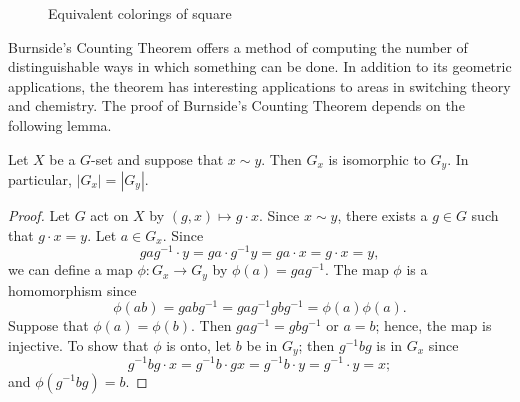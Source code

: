 \begin{figure}[htb]

\begin{center}
\end{center}
\caption{Equivalent colorings of square}
\label{colorings}
\end{figure}
 
 
Burnside's Counting Theorem offers a method of computing the number of
distinguishable ways in which something can be done. In addition to
its geometric applications, the theorem has interesting applications
to areas in switching theory and chemistry. The proof of Burnside's
Counting Theorem depends on the following lemma.
 
 
\begin{lemma}\label{Gset_lemma}
Let $X$ be a $G$-set and suppose that $x \sim y$. Then $G_x$ is
isomorphic to $G_y$.  In particular, $|G_x| = |G_y|$. 
\end{lemma}
 
 
\begin{proof}
Let $G$ act on $X$ by $(g,x) \mapsto g \cdot x$. Since $x \sim y$,
there exists a $g \in G$ such that $g \cdot x=y$. Let $a \in G_x$.
Since 
\[
gag^{-1} \cdot y = ga \cdot g^{-1}y = ga \cdot x = g \cdot
x = y,
\]
we can define a map $\phi: G_x \rightarrow G_y$ by $\phi(a) =
gag^{-1}$. The map $\phi$ is a homomorphism since 
\[
\phi(ab) = gabg^{-1} = gag^{-1} gbg^{-1} = \phi(a) \phi(a).
\]
Suppose that $\phi(a) = \phi(b)$. Then $gag^{-1}= gbg^{-1}$ or $a=b$;
hence, the map is injective.  To show that $\phi$ is onto, let $b$ be
in $G_y$; then $g^{-1}bg$ is in $G_x$ since
\[
g^{-1}bg \cdot x = g^{-1}b \cdot gx = g^{-1}b \cdot y = g^{-1} \cdot y
= x; 
\]
and $\phi(g^{-1}bg ) = b$.
\end{proof}
 
